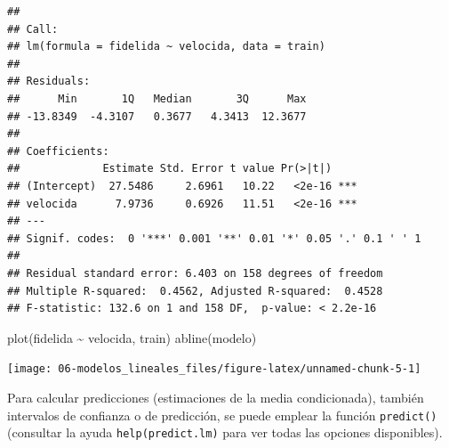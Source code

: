 \documentclass[
]{book}
\newenvironment{Shaded}{\begin{snugshade}}{\end{snugshade}}
\newcommand{\FunctionTok}[1]{\textcolor[rgb]{0.00,0.00,0.00}{#1}}
\newcommand{\NormalTok}[1]{#1}
\newcommand{\SpecialCharTok}[1]{\textcolor[rgb]{0.00,0.00,0.00}{#1}}
\theoremstyle{break}
\theoremstyle{definition}
\theoremstyle{definition}
\theoremstyle{definition}
\theoremstyle{definition}
\theoremstyle{remark}
\begin{document}
\begin{verbatim}
## 
## Call:
## lm(formula = fidelida ~ velocida, data = train)
## 
## Residuals:
##      Min       1Q   Median       3Q      Max 
## -13.8349  -4.3107   0.3677   4.3413  12.3677 
## 
## Coefficients:
##             Estimate Std. Error t value Pr(>|t|)    
## (Intercept)  27.5486     2.6961   10.22   <2e-16 ***
## velocida      7.9736     0.6926   11.51   <2e-16 ***
## ---
## Signif. codes:  0 '***' 0.001 '**' 0.01 '*' 0.05 '.' 0.1 ' ' 1
## 
## Residual standard error: 6.403 on 158 degrees of freedom
## Multiple R-squared:  0.4562, Adjusted R-squared:  0.4528 
## F-statistic: 132.6 on 1 and 158 DF,  p-value: < 2.2e-16
\end{verbatim}

\begin{Shaded}
\begin{Highlighting}[]
\FunctionTok{plot}\NormalTok{(fidelida }\SpecialCharTok{\textasciitilde{}}\NormalTok{ velocida, train)}
\FunctionTok{abline}\NormalTok{(modelo)}
\end{Highlighting}
\end{Shaded}

\begin{center}\texttt{[image: 06-modelos\_lineales\_files/figure-latex/unnamed-chunk-5-1]} \end{center}

Para calcular predicciones (estimaciones de la media condicionada), también intervalos de confianza o de predicción, se puede emplear la función \texttt{predict()} (consultar la ayuda \texttt{help(predict.lm)} para ver todas las opciones disponibles).
\end{document}
